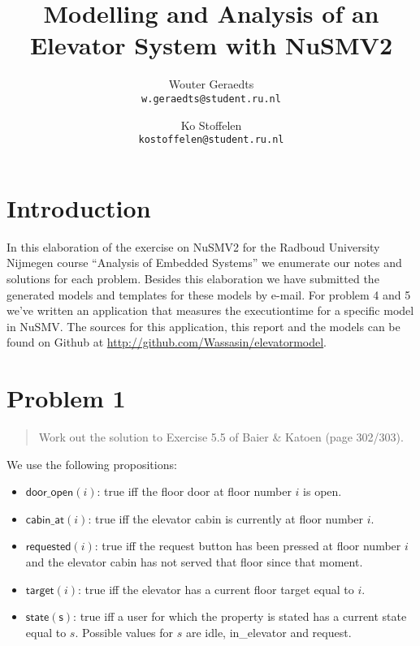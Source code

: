\documentclass[a4paper,10pt]{article}
\title{Modelling and Analysis of an Elevator System with NuSMV2}
\author{
	Wouter Geraedts \\ \small{\texttt{w.geraedts@student.ru.nl}} \and
	Ko Stoffelen     \\ \small{\texttt{kostoffelen@student.ru.nl}}
}
\newcommand{\dooropen}[1]{\mathsf{door\_open}(#1)}
\newcommand{\cabinat}[1]{\mathsf{cabin\_at}(#1)}
\newcommand{\requested}[1]{\mathsf{requested}(#1)}
\newcommand{\target}[1]{\mathsf{target}(#1)}
\newcommand{\state}[1]{\mathsf{state}(\mathsf{#1})}
\begin{document}
	\maketitle


	\section{Introduction}

	In this elaboration of the exercise on NuSMV2 for the Radboud University Nijmegen course ``Analysis of Embedded Systems'' we enumerate our notes and solutions for each problem. Besides this elaboration we have submitted the generated models and templates for these models by e-mail. For problem 4 and 5 we've written an application that measures the executiontime for a specific model in NuSMV. The sources for this application, this report and the models can be found on Github at \url{http://github.com/Wassasin/elevatormodel}.
	
	\section{Problem 1}
	
	\begin{quote}
		Work out the solution to Exercise 5.5 of Baier \& Katoen (page 302/303).
	\end{quote}
	
	We use the following propositions:
	\begin{itemize}
		\item \(\dooropen{i}\): true iff the floor door at floor number \(i\) is open.
		\item \(\cabinat{i}\): true iff the elevator cabin is currently at floor number \(i\).
		\item \(\requested{i}\): true iff the request button has been pressed at floor number \(i\) and the elevator cabin has not served that floor since that moment.
		\item \(\target{i}\): true iff the elevator has a current floor target equal to \(i\).
		\item \(\state{s}\): true iff a user for which the property is stated has a current state equal to \(s\). Possible values for \(s\) are idle, in\_elevator and request.
	\end{itemize}
	
\end{document}
